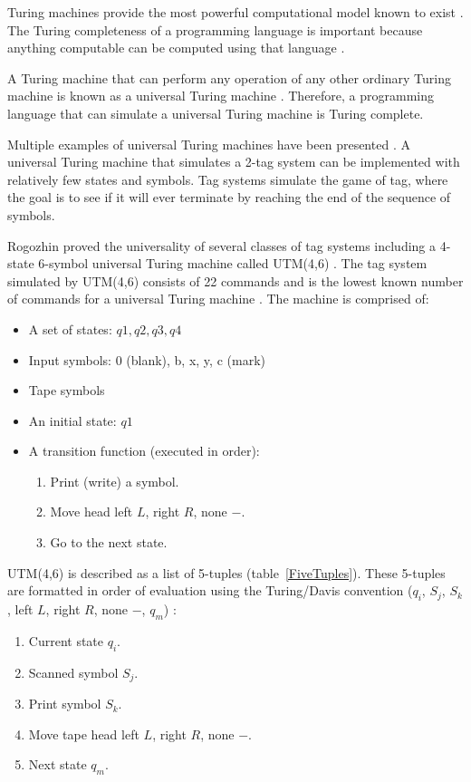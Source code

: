 Turing machines provide the most powerful computational model known to exist \cite{kepser_01}.  The Turing completeness of a programming language is important because anything computable can be computed using that language \cite{kepser_01}.

\indent
A Turing machine that can perform any operation of any other ordinary Turing machine is known as a universal Turing machine \cite{moore_01}.  Therefore, a programming language that can simulate a universal Turing machine is Turing complete.

Multiple examples of universal Turing machines have been presented \cite{rogozhin_01,shannon_01,neary_01}.  A universal Turing machine that simulates a 2-tag system can be implemented with relatively few states and symbols.  Tag systems simulate the game of tag, where the goal is to see if it will ever terminate by reaching the end of the sequence of symbols.

\indent
Rogozhin proved the universality of several classes of tag systems including a 4-state 6-symbol universal Turing machine called UTM(4,6) \cite{rogozhin_01}.  The tag system simulated by UTM(4,6) consists of 22 commands and is the lowest known number of commands for a universal Turing machine \cite{rogozhin_01}.  The machine is comprised of:
\begin{itemize}
  \item A set of states: $q1, q2, q3, q4$
  \item Input symbols: 0 (blank), b, x, y, c (mark)
  \item Tape symbols
  \item An initial state: $q1$
  \item A transition function (executed in order):
  \begin{enumerate}
    \item Print (write) a symbol.
    \item Move head left $L$, right $R$, none $-$.
    \item Go to the next state. 
  \end{enumerate}
\end{itemize}

\indent
UTM(4,6) \cite{rogozhin_01} is described as a list of 5-tuples (table~\ref{FiveTuples}).  These 5-tuples are formatted in order of evaluation using the Turing/Davis convention ($q_i$, $S_j$, $S_k$, left $L$, right $R$, none $-$, $q_m$) \cite{kumar_01}:
\begin{enumerate}
  \item Current state $q_i$.
  \item Scanned symbol $S_j$.
  \item Print symbol $S_k$.
  \item Move tape head left $L$, right $R$, none $-$.
  \item Next state $q_m$.
\end{enumerate}

